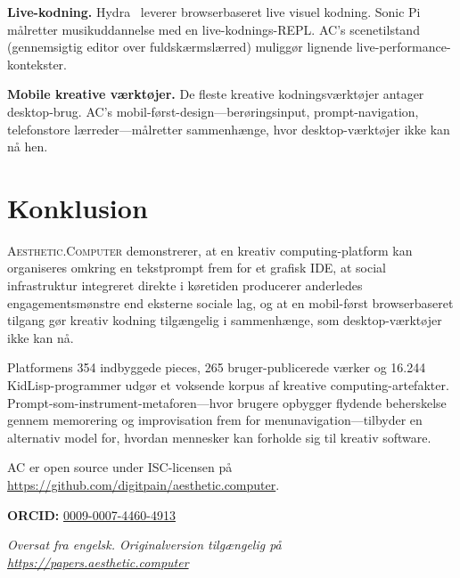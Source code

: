 \documentclass[10pt,letterpaper,twocolumn]{article}
\newcommand{\ac}{\textsc{Aesthetic.Computer}}
\begin{document}
\textbf{Live-kodning.} Hydra~\citep{hydra2019} leverer browserbaseret live visuel kodning. Sonic Pi~\citep{aaron2016sonic} målretter musikuddannelse med en live-kodnings-REPL. AC's scenetilstand (gennemsigtig editor over fuldskærmslærred) muliggør lignende live-performance-kontekster.

\textbf{Mobile kreative værktøjer.} De fleste kreative kodningsværktøjer antager desktop-brug. AC's mobil-først-design---berøringsinput, prompt-navigation, telefonstore lærreder---målretter sammenhænge, hvor desktop-værktøjer ikke kan nå hen.


\section{Konklusion}

\ac{} demonstrerer, at en kreativ computing-platform kan organiseres omkring en tekstprompt frem for et grafisk IDE, at social infrastruktur integreret direkte i køretiden producerer anderledes engagementsmønstre end eksterne sociale lag, og at en mobil-først browserbaseret tilgang gør kreativ kodning tilgængelig i sammenhænge, som desktop-værktøjer ikke kan nå.

Platformens 354 indbyggede pieces, 265 bruger-publicerede værker og 16.244 KidLisp-programmer udgør et voksende korpus af kreative computing-artefakter. Prompt-som-instrument-metaforen---hvor brugere opbygger flydende beherskelse gennem memorering og improvisation frem for menunavigation---tilbyder en alternativ model for, hvordan mennesker kan forholde sig til kreativ software.

AC er open source under ISC-licensen på \url{https://github.com/digitpain/aesthetic.computer}.

\vspace{0.5em}
\noindent\textbf{ORCID:} \href{https://orcid.org/0009-0007-4460-4913}{0009-0007-4460-4913}

\vspace{0.5em}\noindent\textit{Oversat fra engelsk. Originalversion tilgængelig på \url{https://papers.aesthetic.computer}}




\end{document}
